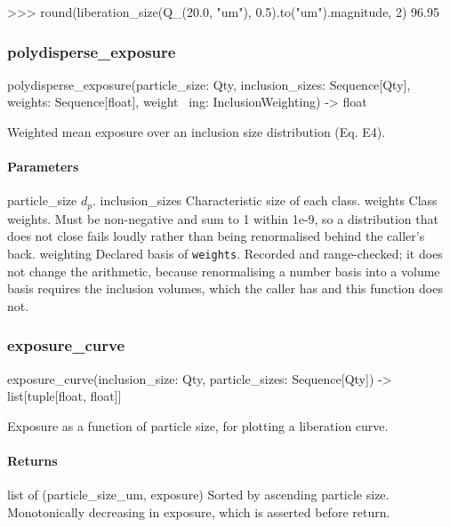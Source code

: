 \documentclass[10pt,a4paper,twoside]{report}
\begin{document}
\begin{doctestblock}
>>> round(liberation_size(Q_(20.0, "um"), 0.5).to("um").magnitude, 2)
96.95
\end{doctestblock}

\subsubsection*{polydisperse\_exposure}

\begin{verbatimsmall}
polydisperse_exposure(particle_size: Qty, inclusion_sizes: Sequence[Qty], weights: Sequence[float], weight
    \ ing: InclusionWeighting) -> float
\end{verbatimsmall}

Weighted mean exposure over an inclusion size distribution (Eq. E4).

\paragraph*{Parameters}

particle\_size $d_p$. inclusion\_sizes Characteristic size of each class. weights Class weights. Must be non-negative and sum to 1 within 1e-9, so a distribution that does not close fails loudly rather than being renormalised behind the caller's back. weighting Declared basis of \texttt{weights}. Recorded and range-checked; it does not change the arithmetic, because renormalising a number basis into a volume basis requires the inclusion volumes, which the caller has and this function does not.

\subsubsection*{exposure\_curve}

\begin{verbatimsmall}
exposure_curve(inclusion_size: Qty, particle_sizes: Sequence[Qty]) -> list[tuple[float, float]]
\end{verbatimsmall}

Exposure as a function of particle size, for plotting a liberation curve.

\paragraph*{Returns}

list of (particle\_size\_um, exposure) Sorted by ascending particle size. Monotonically decreasing in exposure, which is asserted before return.
\end{document}
